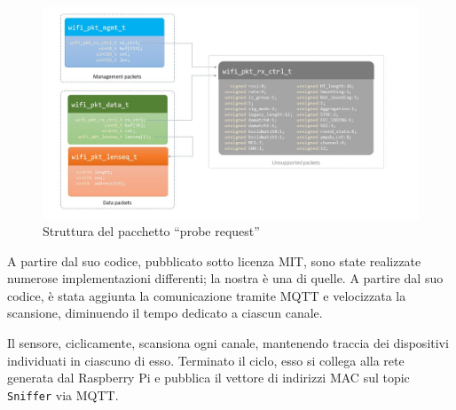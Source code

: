 \begin{figure}[H]
  \centering
  \includegraphics[width=\textwidth]{res/fig/sniffer.jpg}
  \caption{Struttura del pacchetto ``probe request''}%
  \label{fig:probe}
\end{figure}

A partire dal suo codice, pubblicato sotto licenza MIT, sono state realizzate numerose implementazioni differenti;
la nostra è una di quelle.
A partire dal suo codice, è stata aggiunta la comunicazione tramite MQTT e velocizzata la scansione, diminuendo il tempo dedicato a ciascun canale.

Il sensore, ciclicamente, scansiona ogni canale, mantenendo traccia dei dispositivi individuati in ciascuno di esso.
Terminato il ciclo, esso si collega alla rete generata dal Raspberry Pi e pubblica il vettore di indirizzi MAC sul topic \texttt{Sniffer} via MQTT.
